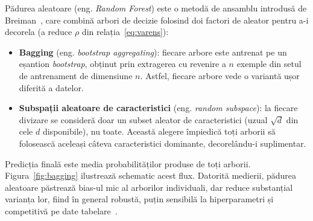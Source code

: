 \documentclass[12pt,a4paper]{report}
\begin{document}
Pădurea aleatoare (eng. \emph{Random Forest}) este o metodă de ansamblu introdusă de
Breiman~\cite{breiman2001random}, care combină arbori de decizie folosind doi factori de aleator
pentru a-i decorela (a reduce $\rho$ din relația~\eqref{eq:varens}):
\begin{itemize}
  \item \textbf{Bagging} (eng. \emph{bootstrap aggregating}): fiecare arbore este antrenat pe un
    eșantion \emph{bootstrap}, obținut prin extragerea cu revenire a $n$ exemple din setul de
    antrenament de dimensiune $n$. Astfel, fiecare arbore vede o variantă ușor diferită a datelor.
  \item \textbf{Subspații aleatoare de caracteristici} (eng. \emph{random subspace}): la fiecare
    divizare se consideră doar un subset aleator de caracteristici (uzual $\sqrt{d}$ din cele $d$
    disponibile), nu toate. Această alegere împiedică toți arborii să folosească aceleași câteva
    caracteristici dominante, decorelându-i suplimentar.
\end{itemize}
Predicția finală este media probabilităților produse de toți arborii. Figura~\ref{fig:bagging}
ilustrează schematic acest flux. Datorită medierii, pădurea aleatoare păstrează bias-ul mic al
arborilor individuali, dar reduce substanțial varianța lor, fiind în general robustă, puțin
sensibilă la hiperparametri și competitivă pe date tabelare~\cite{breiman2001random,
hastie2009elements}.
\end{document}
